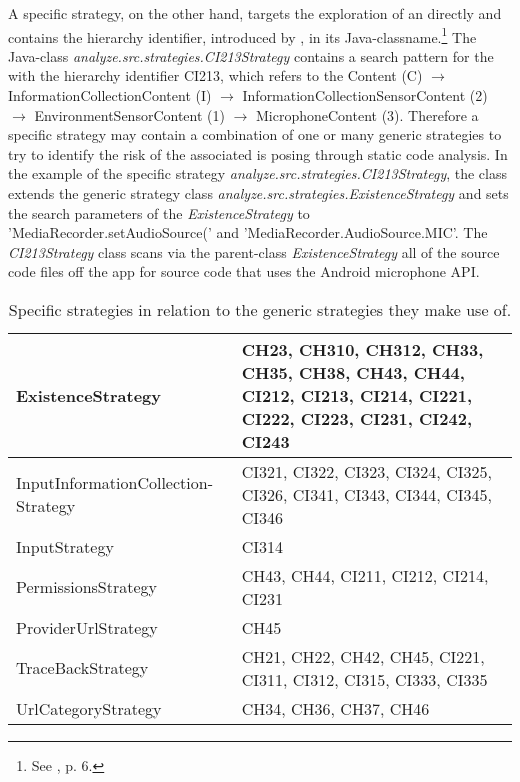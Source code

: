 A specific strategy, on the other hand, targets the exploration of an \ipp directly and contains the \ipp hierarchy identifier, introduced by \textcite{Dehling2016}, in its Java-classname.\footnote{See \cite{Dehling2016}, p. 6.}
The Java-class \textit{analyze.src.strategies.CI213\textunderscore Strategy} contains a search pattern for the \ipp with the hierarchy identifier CI213, which refers to the \ipp Content (C) $\rightarrow$ InformationCollectionContent (I) $\rightarrow$ InformationCollectionSensorContent (2) $\rightarrow$ EnvironmentSensorContent (1) $\rightarrow$ MicrophoneContent (3).
Therefore a specific strategy may contain a combination of one or many generic strategies to try to identify the risk of the associated \ipp is posing through static code analysis.
In the example of the specific strategy \textit{analyze.src.strategies.CI213\textunderscore Strategy}, the class extends the generic strategy class \textit{analyze.src.strategies.ExistenceStrategy} and sets the search parameters of the \textit{ExistenceStrategy} to 'MediaRecorder.setAudioSource(' and 'MediaRecorder.AudioSource.MIC'.
The \textit{CI213\textunderscore Strategy} class scans via the parent-class \textit{ExistenceStrategy} all of the source code files off the app for source code that uses the Android microphone \acs{API}.

\begin{table}
	\begin{center}

	\begin{tabular}{ | p{4.8cm} | p{9cm} | }
	\hline
		ExistenceStrategy & CH23, CH310, CH312, CH33, CH35, CH38, CH43, CH44, CI212, CI213, CI214, CI221, CI222, CI223, CI231, CI242, CI243 \\ \hline
		InputInformationCollection-Strategy & CI321, CI322, CI323, CI324, CI325, CI326, CI341, CI343, CI344, CI345, CI346 \\ \hline
		InputStrategy & CI314 \\ \hline
		PermissionsStrategy & CH43, CH44, CI211, CI212, CI214, CI231 \\ \hline
		ProviderUrlStrategy & CH45 \\ \hline
		TraceBackStrategy & CH21, CH22, CH42, CH45, CI221, CI311, CI312, CI315, CI333, CI335 \\ \hline
		UrlCategoryStrategy & CH34, CH36, CH37, CH46 \\ \hline
	\end{tabular}
	\end{center}
	
	\caption{Specific strategies in relation to the generic strategies they make use of.} 
	\label{table:specStrategies}
\end{table}

